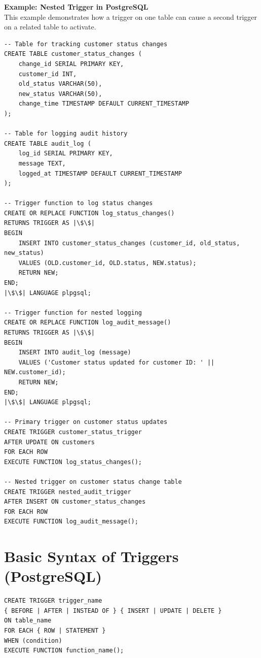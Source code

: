 \documentclass{article}
\begin{document}
\textbf{Example: Nested Trigger in PostgreSQL}\\
This example demonstrates how a trigger on one table can cause a second trigger on a related table to activate.

\begin{verbatim}
-- Table for tracking customer status changes
CREATE TABLE customer_status_changes (
    change_id SERIAL PRIMARY KEY,
    customer_id INT,
    old_status VARCHAR(50),
    new_status VARCHAR(50),
    change_time TIMESTAMP DEFAULT CURRENT_TIMESTAMP
);

-- Table for logging audit history
CREATE TABLE audit_log (
    log_id SERIAL PRIMARY KEY,
    message TEXT,
    logged_at TIMESTAMP DEFAULT CURRENT_TIMESTAMP
);

-- Trigger function to log status changes
CREATE OR REPLACE FUNCTION log_status_changes()
RETURNS TRIGGER AS |\$\$|
BEGIN
    INSERT INTO customer_status_changes (customer_id, old_status, new_status)
    VALUES (OLD.customer_id, OLD.status, NEW.status);
    RETURN NEW;
END;
|\$\$| LANGUAGE plpgsql;

-- Trigger function for nested logging
CREATE OR REPLACE FUNCTION log_audit_message()
RETURNS TRIGGER AS |\$\$|
BEGIN
    INSERT INTO audit_log (message)
    VALUES ('Customer status updated for customer ID: ' || NEW.customer_id);
    RETURN NEW;
END;
|\$\$| LANGUAGE plpgsql;

-- Primary trigger on customer status updates
CREATE TRIGGER customer_status_trigger
AFTER UPDATE ON customers
FOR EACH ROW
EXECUTE FUNCTION log_status_changes();

-- Nested trigger on customer status change table
CREATE TRIGGER nested_audit_trigger
AFTER INSERT ON customer_status_changes
FOR EACH ROW
EXECUTE FUNCTION log_audit_message();
\end{verbatim}

\section{Basic Syntax of Triggers (PostgreSQL)}
\begin{verbatim}
CREATE TRIGGER trigger_name
{ BEFORE | AFTER | INSTEAD OF } { INSERT | UPDATE | DELETE }
ON table_name
FOR EACH { ROW | STATEMENT }
WHEN (condition)
EXECUTE FUNCTION function_name();
\end{verbatim}
\end{document}
